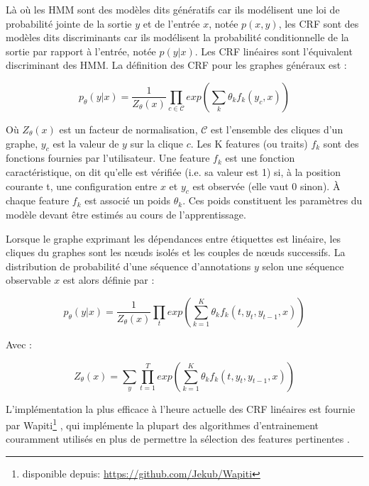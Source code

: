 \documentclass[PhD-Yoann-Dupont.tex]{subfiles}
\begin{document}
Là où les HMM sont des modèles dits génératifs \citep{gaussier2011modeles} car ils modélisent une loi de probabilité jointe de la sortie $y$ et de l'entrée $x$, notée $p(x,y)$, les CRF sont des modèles dits discriminants car ils modélisent la probabilité conditionnelle de la sortie par rapport à l'entrée, notée $p(y|x)$. Les CRF linéaires sont l'équivalent discriminant des HMM. La définition des CRF pour les graphes généraux est :

\begin{equation}\label{eq:general-CRF}
p_\theta(y|x) = \frac{1}{Z_\theta(x)} \prod_{c \in \mathcal{C}} exp \left(\sum_{k} \theta_{k} f_{k}(y_{c}, x) \right)
\end{equation}

Où $Z_\theta(x)$ est un facteur de normalisation, $\mathcal{C}$ est l'ensemble des cliques d'un graphe, $y_{c}$ est la valeur de $y$ sur la clique $c$. Les K features (ou traits) $f_{k}$ sont des fonctions fournies par l'utilisateur. Une feature $f_{k}$ est une fonction caractéristique, on dit qu'elle est vérifiée (i.e. sa valeur est 1) si, à la position courante t, une configuration entre $x$ et $y_{c}$ est observée (elle vaut 0 sinon). À chaque feature $f_{k}$ est associé un poids $\theta_{k}$. Ces poids constituent les paramètres du modèle devant être estimés au cours de l'apprentissage.

Lorsque le graphe exprimant les dépendances entre étiquettes est linéaire, les cliques du graphes sont les n\oe uds isolés et les couples de n\oe uds successifs. La distribution de probabilité d'une séquence d'annotations $y$ selon une séquence observable $x$ est alors définie par :

\begin{equation}\label{eq:linear-CRF}
p_\theta(y|x) = \frac{1}{Z_\theta(x)} \prod_{t} exp \left(\sum^{K}_{k=1} \theta_{k} f_{k}(t, y_{t}, y_{t-1}, x) \right)
\end{equation}

Avec :

\begin{equation}\label{eq:CRF-normalization}
Z_\theta(x) = \sum_{y} \prod^{T}_{t=1} exp \left(\sum^{K}_{k=1} \theta_{k} f_{k}(t, y_{t}, y_{t-1}, x) \right)
\end{equation}

L'implémentation la plus efficace à l'heure actuelle des CRF linéaires est fournie par Wapiti\footnote{disponible depuis: \url{https://github.com/Jekub/Wapiti}} \cite{lavergne10}, qui implémente la plupart des algorithmes d'entrainement couramment utilisés en plus de permettre la sélection des features pertinentes%
.
\end{document}
